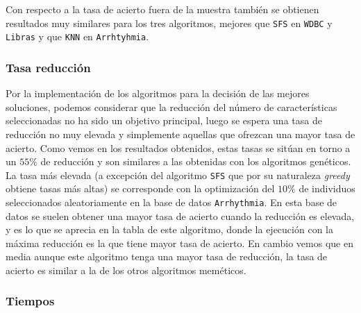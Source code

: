 \documentclass[11pt,leqno]{article}
\begin{document}
	Con respecto a la tasa de acierto fuera de la muestra también se obtienen resultados muy similares para los tres algoritmos, mejores que \texttt{SFS} en \texttt{WDBC} y \texttt{Libras} y que \texttt{KNN} en \texttt{Arrhtyhmia}.

\subsubsection{Tasa reducción}
\begin{center}
\end{center}

	Por la implementación de los algoritmos para la decisión de las mejores soluciones, podemos considerar que la reducción del número de características seleccionadas no ha sido un objetivo principal, luego se espera una tasa de reducción no muy elevada y simplemente aquellas que ofrezcan una mayor tasa de acierto. Como vemos en los resultados obtenidos, estas tasas se sitúan en torno a un $55\%$ de reducción y son similares a las obtenidas con los algoritmos genéticos. La tasa más elevada (a excepción del algoritmo \texttt{SFS} que por su naturaleza \textit{greedy} obtiene tasas más altas) se corresponde con la optimización del $10\%$ de individuos seleccionados aleatoriamente en la base de datos \texttt{Arrhythmia}. En esta base de datos se suelen obtener una mayor tasa de acierto cuando la reducción es elevada, y es lo que se aprecia en la tabla de este algoritmo, donde la ejecución con la máxima reducción es la que tiene mayor tasa de acierto. En cambio vemos que en media aunque este algoritmo tenga una mayor tasa de reducción, la tasa de acierto es similar a la de los otros algoritmos meméticos.
	
	
\subsubsection{Tiempos}
\end{document}
